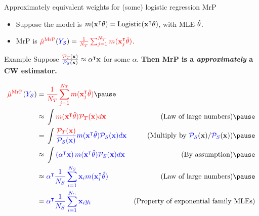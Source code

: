 \begin{frame}[t]{Approximately equivalent weights for (some) logistic regression MrP}

\def\alphav{\mathbf{\alpha}}
%
\begin{itemize}
    \item Suppose the model is $m(\mathbf{x}^\intercal \theta) = \mathrm{Logistic}(\mathbf{x}^\intercal \theta)$, with MLE $\hat{\theta}$.
    \item MrP is $\textcolor{red}{\hat{\mu}^{\mathrm{MrP}}}(\textcolor{blue}{\textcolor{blue}{Y_{\mathcal{S}}}}) = \textcolor{red}{\frac{1}{{N_T}} \sum_{j=1}^{N_T} m(\mathbf{x}_j^\intercal \hat{\theta})}$.
\end{itemize}

\begin{block}{Example}
Suppose
    $\frac{\tarcol{\ptar}(\x)}{\surcol{\psur}(\x)} \approx \alphav^\trans \x$ for some $\alpha$.
    \textbf{Then MrP is a \emph{approximately} a CW estimator.}
\end{block}
\pause
$$
\begin{aligned}
\muhatmrp ={}& \tarcol{\meantar \m(\x_j^\trans \thetahat)} \pause
\\ \approx{}&
    \int \tarcol{
        \m(\x^\trans \thetahat) \ptar(\x) d\x
    }
    & \textrm{(Law of large numbers)} \pause
\\ ={}&
    \int
    \surcol{
        \frac{\tarcol{\ptar(\x)}}{\psur(\x)} \m(\x^\trans \thetahat) \psur(\x) d\x
    }
    & \textrm{(Multiply by $\psur(\x) / \psur(\x)$)} \pause
\\ \approx{}&
    \int \surcol{
        \left( \alphav^\trans \x\right) \m(\x^\trans \thetahat) \psur(\x) d\x
    }
    & \textrm{(By assumption)} \pause
\\ \approx{}&
    \surcol{
        \alphav^\trans \meansur \x_i \m(\x_i^\trans \thetahat)
    }
    & \textrm{(Law of large numbers)}\pause
\\={}&
    \surcol{
        \alphav^\trans \meansur \x_i \y_i
    }
    & \textrm{(Property of exponential family MLEs)}
\end{aligned}
$$


\end{frame}



